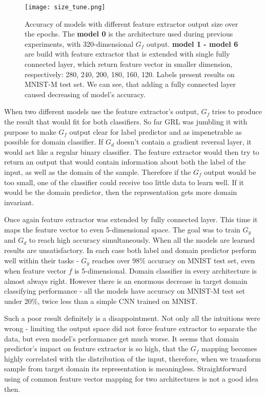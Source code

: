 \documentclass{article}
\begin{document}
\begin{figure}[htb]%
    \centering
    \texttt{[image: size\_tune.png]}%
    \caption{Accuracy of models with different feature extractor output size over the epochs. The \textbf{model 0} is the architecture used during previous experiments, with 320-dimensional $G_{f}$ output. \textbf{model 1 - model 6} are build with feature extractor that is extended with single fully connected layer, which return feature vector in smaller dimension, respectively: 280, 240, 200, 180, 160, 120. Labels present results on MNIST-M test set. We can see, that adding a fully connected layer caused decreasing of model's accuracy. }
    \label{fig:size_tune}%
\end{figure}
\par
When two different models use the feature extractor's output, $G_{f}$ tries to produce the result that would fit for both classifiers. So far GRL was jumbling it with purpose to make $G_{f}$ output clear for label predictor and as impenetrable as possible for domain classifier. If $G_{d}$ doesn't contain a gradient reversal layer, it would act like a regular binary classifier. The feature extractor would then try to return an output that would contain information about both the label of the input, as well as the domain of the sample. Therefore if the $G_{f}$ output would be too small, one of the classifier could receive too little data to learn well. If it would be the domain predictor, then the representation gets more domain invariant.
\par
Once again feature extractor was extended by fully connected layer. This time it maps the feature vector to even 5-dimensional space. The goal was to train $G_{y}$ and $G_{d}$ to reach high accuracy simultaneously. When all the models are learned results are unsatisfactory. In each case both label and domain predictor perform well within their tasks - $G_{y}$ reaches over 98\% accuracy on MNIST test set, even when feature vector $f$ is 5-dimensional. Domain classifier in every architecture is almost always right. However there is an enormous decrease in target domain classifying performance - all the models have accuracy on MNIST-M test set under 20\%, twice less than a simple CNN trained on MNIST.
\par
Such a poor result definitely is a disappointment. Not only all the intuitions were wrong - limiting the output space did not force feature extractor to separate the data, but even model's performance get much worse. It seems that domain predictor's impact on feature extractor is so high, that the $G_{f}$ mapping becomes highly correlated with the distribution of the input, therefore, when we transform sample from target domain its representation is meaningless. Straightforward using of common feature vector mapping for two architectures is not a good idea then.
\end{document}
